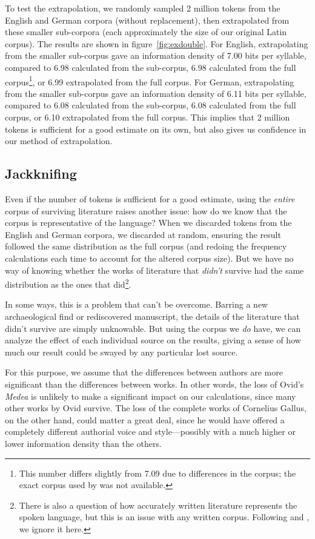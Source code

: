 \documentclass[12pt,twoside]{article}
\begin{document}
To test the extrapolation, we randomly sampled 2 million tokens from the English and German corpora (without replacement), then extrapolated from these smaller sub-corpora (each approximately the size of our original Latin corpus). The results are shown in figure~\ref{fig:exdouble}. For English, extrapolating from the smaller sub-corpus gave an information density of 7.00 bits per syllable, compared to 6.98 calculated from the sub-corpus, 6.98 calculated from the full corpus\footnote{This number differs slightly from  7.09 due to differences in the corpus; the exact corpus used by \citeauthor{oh} was not available.}, or 6.99 extrapolated from the full corpus. For German, extrapolating from the smaller sub-corpus gave an information density of 6.11 bits per syllable, compared to 6.08 calculated from the sub-corpus, 6.08 calculated from the full corpus, or 6.10 extrapolated from the full corpus. This implies that 2 million tokens is sufficient for a good estimate on its own, but also gives us confidence in our method of extrapolation.

\subsection{Jackknifing}

Even if the number of tokens is sufficient for a good estimate, using the \emph{entire} corpus of surviving literature raises another issue: how do we know that the corpus is representative of the language? When we discarded tokens from the English and German corpora, we discarded at random, ensuring the result followed the same distribution as the full corpus (and redoing the frequency calculations each time to account for the altered corpus size). But we have no way of knowing whether the works of literature that \emph{didn't} survive had the same distribution as the ones that did\footnote{There is also a question of how accurately written literature represents the spoken language, but this is an issue with any written corpus. Following \citet{oh} and \citet{coupé}, we ignore it here.}.

In some ways, this is a problem that can't be overcome. Barring a new archaeological find or rediscovered manuscript, the details of the literature that didn't survive are simply unknowable. But using the corpus we \emph{do} have, we can analyze the effect of each individual source on the results, giving a sense of how much our result could be swayed by any particular lost source.

For this purpose, we assume that the differences between authors are more significant than the differences between works. In other words, the loss of Ovid's \emph{Medea} is unlikely to make a significant impact on our calculations, since many other works by Ovid survive. The loss of the complete works of Cornelius Gallus, on the other hand, could matter a great deal, since he would have offered a completely different authorial voice and style---possibly with a much higher or lower information density than the others.
\end{document}
